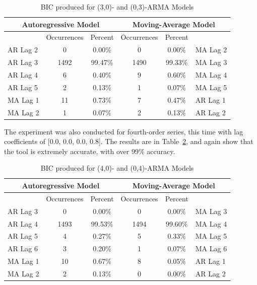 \documentclass[oneside,12pt,openany]{book}
\begin{document}
    \FloatBarrier
     \begin{table}[hbt!]
        \centering
        \begin{tabular}{|l|c|c|c|c|l|}
            \hline
            \multicolumn{3}{|c|}{Autoregressive Model} & \multicolumn{3}{c|}{Moving-Average Model} \\ \hline
            \cellcolor{black} & Occurrences & Percent & Occurrences & Percent & \cellcolor{black} \\ \hline
            AR Lag 2 & 0 & 0.00\% & 0 & 0.00\% & MA Lag 2 \\ \hline
            AR Lag 3 & 1492 & 99.47\% & 1490 & 99.33\% & MA Lag 3 \\ \hline
            AR Lag 4 & 6 & 0.40\% & 9 & 0.60\% & MA Lag 4 \\ \hline
            AR Lag 5 & 2 & 0.13\% & 1 & 0.07\% & MA Lag 5 \\ \hline
            MA Lag 1 & 11 & 0.73\% & 7 & 0.47\% & AR Lag 1 \\ \hline
            MA Lag 2 & 1 & 0.07\% & 2 & 0.13\% & AR Lag 2 \\ \hline
        \end{tabular}
        \caption{BIC produced for (3,0)- and (0,3)-ARMA Models}
        \label{tab:bic3}
    \end{table}

    \FloatBarrier

    The experiment was also conducted for fourth-order series, this time with lag coefficients of [0.0, 0.0, 0.0, 0.8]. The results are in Table~\ref{tab:bic4}, and again show that the tool is extremely accurate, with over 99\% accuracy.
    
    \begin{table}[hbt!]
        \centering
        \begin{tabular}{|l|c|c|c|c|l|}
            \hline
            \multicolumn{3}{|c|}{Autoregressive Model} & \multicolumn{3}{c|}{Moving-Average Model} \\ \hline
            \cellcolor{black} & Occurrences & Percent & Occurrences & Percent & \cellcolor{black} \\ \hline
            AR Lag 3 & 0 & 0.00\% & 0 & 0.00\% & MA Lag 3 \\ \hline
            AR Lag 4 & 1493 & 99.53\% & 1494 & 99.60\% & MA Lag 4 \\ \hline
            AR Lag 5 & 4 & 0.27\% & 5 & 0.33\% & MA Lag 5 \\ \hline
            AR Lag 6 & 3 & 0.20\% & 1 & 0.07\% & MA Lag 6 \\ \hline
            MA Lag 1 & 10 & 0.67\% & 8 & 0.05\% & AR Lag 1 \\ \hline
            MA Lag 2 & 2 & 0.13\% & 0 & 0.00\% & AR Lag 2 \\ \hline
        \end{tabular}
        \caption{BIC produced for (4,0)- and (0,4)-ARMA Models}
        \label{tab:bic4}
    \end{table}
\end{document}

